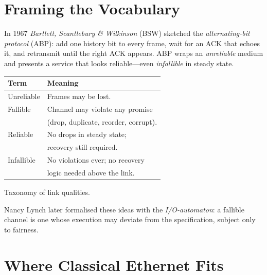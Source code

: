 \documentclass[../main.tex]{subfiles} %
\begin{document}
{{{{{{%

\section{Framing the Vocabulary}

In 1967 \emph{Bartlett, Scantlebury \& Wilkinson} (BSW) sketched the
\emph{alternating-bit protocol} (ABP): add one history bit to every frame,
wait for an ACK that echoes it, and retransmit until the right ACK appears.
ABP wraps an \emph{unreliable} medium and presents a service that looks
reliable---even \emph{infallible} in steady state.

\begin{marginfigure}
  \footnotesize
  \centering
  \begin{tabular}{@{}l@{~}l@{}}
    \toprule
    Term & Meaning\\
    \midrule
    Unreliable & Frames may be lost.\\
    Fallible   & Channel may violate any promise\\
               & (drop, duplicate, reorder, corrupt).\\
    Reliable   & No drops in steady state;\\
               & recovery still required.\\
    Infallible & No violations ever; no recovery\\
               & logic needed above the link.\\
    \bottomrule
  \end{tabular}
  \caption{Taxonomy of link qualities.\label{tab:taxonomy}}
\end{marginfigure}

Nancy Lynch later formalised these ideas with the
\emph{I/O-automaton}: a fallible channel is one whose execution may
deviate from the specification, subject only to fairness.

\section{Where Classical Ethernet Fits}

}}}}}}
\end{document}
